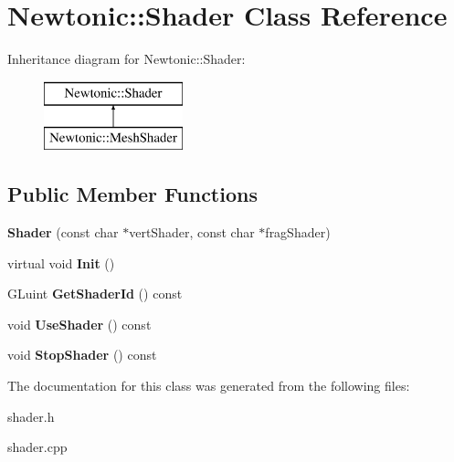\hypertarget{classNewtonic_1_1Shader}{}\section{Newtonic\+::Shader Class Reference}
\label{classNewtonic_1_1Shader}
Inheritance diagram for Newtonic\+::Shader\+:\begin{figure}[H]
\begin{center}
\leavevmode
\includegraphics[height=2.000000cm]{classNewtonic_1_1Shader}
\end{center}
\end{figure}
\subsection*{Public Member Functions}
\begin{DoxyCompactItemize}
\item 
\mbox{\label{classNewtonic_1_1Shader_aff867937766303d034da281836612b55}} 
{\bfseries Shader} (const char $\ast$vert\+Shader, const char $\ast$frag\+Shader)
\item 
\mbox{\label{classNewtonic_1_1Shader_a7f082a166b24d63e27efc46c5113a204}} 
virtual void {\bfseries Init} ()
\item 
\mbox{\label{classNewtonic_1_1Shader_a46d218f7ef7519042643812c257ce537}} 
G\+Luint {\bfseries Get\+Shader\+Id} () const
\item 
\mbox{\label{classNewtonic_1_1Shader_a9ca5577a2264f63b1fe4a963e0c6e047}} 
void {\bfseries Use\+Shader} () const
\item 
\mbox{\label{classNewtonic_1_1Shader_a41358841bd89c3ae8db47f61db421387}} 
void {\bfseries Stop\+Shader} () const
\end{DoxyCompactItemize}


The documentation for this class was generated from the following files\+:\begin{DoxyCompactItemize}
\item 
shader.\+h\item 
shader.\+cpp\end{DoxyCompactItemize}
